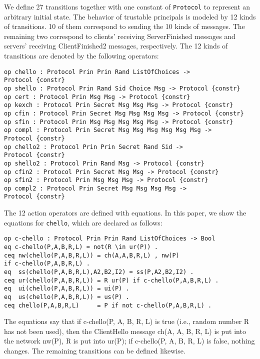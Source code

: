 \documentclass[a4paper,fleqn]{cas-dc}
\begin{document}
We define 27 transitions together with one constant of \verb!Protocol! to represent an arbitrary initial state.
The behavior of trustable principals is modeled by 12
kinds of transitions. 10 of them correspond to sending
the 10 kinds of messages. The remaining two correspond
to clients’ receiving ServerFinished messages and
servers’ receiving ClientFinished2 messages, respectively.
The 12 kinds of transitions are denoted by the following operators:
\begin{small}
\begin{verbatim}
op chello : Protocol Prin Prin Rand ListOfChoices ->
Protocol {constr}
op shello : Protocol Prin Rand Sid Choice Msg -> Protocol {constr}
op cert : Protocol Prin Msg Msg -> Protocol {constr}
op kexch : Protocol Prin Secret Msg Msg Msg -> Protocol {constr}
op cfin : Protocol Prin Secret Msg Msg Msg Msg -> Protocol {constr}
op sfin : Protocol Prin Msg Msg Msg Msg Msg -> Protocol {constr}
op compl : Protocol Prin Secret Msg Msg Msg Msg Msg Msg ->
Protocol {constr}
op chello2 : Protocol Prin Prin Secret Rand Sid -> 
Protocol {constr}
op shello2 : Protocol Prin Rand Msg -> Protocol {constr}
op cfin2 : Protocol Prin Secret Msg Msg -> Protocol {constr}
op sfin2 : Protocol Prin Msg Msg Msg -> Protocol {constr}
op compl2 : Protocol Prin Secret Msg Msg Msg Msg -> 
Protocol {constr} 
\end{verbatim}
\end{small}	

The 12 action operators are defined with equations. In
this paper, we show the equations for \verb!chello!, which are declared as follows:
\begin{small}
\begin{verbatim}
op c-chello : Protocol Prin Prin Rand ListOfChoices -> Bool
eq c-chello(P,A,B,R,L) = not(R \in ur(P)) .
ceq nw(chello(P,A,B,R,L)) = ch(A,A,B,R,L) , nw(P) 
if c-chello(P,A,B,R,L) .
eq  ss(chello(P,A,B,R,L),A2,B2,I2) = ss(P,A2,B2,I2) .
ceq ur(chello(P,A,B,R,L)) = R ur(P) if c-chello(P,A,B,R,L) .
eq  ui(chello(P,A,B,R,L)) = ui(P) .
eq  us(chello(P,A,B,R,L)) = us(P) .
ceq chello(P,A,B,R,L)     = P if not c-chello(P,A,B,R,L) . 
\end{verbatim}
\end{small}	
The  equations  say  that  if c-chello(P, A, B, R, L) is  true
(i.e., random number R has   not   been   used), then the ClientHello message ch(A, A, B, R, L) is put into the network nw(P), R is put into ur(P); if c-chello(P, A, B, R, L) is  false,  nothing  changes.  The remaining transitions can be defined likewise.
\end{document}
